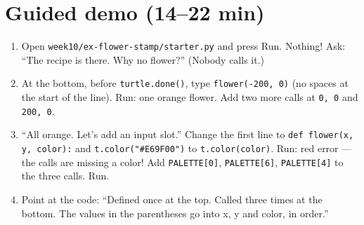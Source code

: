 \section{Guided demo (14--22 min)}
\begin{workedexample}
\begin{enumerate}[leftmargin=1.4em,itemsep=1pt]
  \item Open \texttt{week10/ex-flower-stamp/starter.py} and press Run. Nothing! Ask: \enquote{The recipe is there. Why no flower?} (Nobody calls it.)
  \item At the bottom, before \texttt{turtle.done()}, type \texttt{flower(-200, 0)} (no spaces at the start of the line). Run: one orange flower. Add two more calls at \texttt{0, 0} and \texttt{200, 0}.
  \item \enquote{All orange. Let's add an input slot.} Change the first line to \texttt{def flower(x, y, color):} and \texttt{t.color("\#E69F00")} to \texttt{t.color(color)}. Run: red error --- the calls are missing a color! Add \texttt{PALETTE[0]}, \texttt{PALETTE[6]}, \texttt{PALETTE[4]} to the three calls. Run.
  \item Point at the code: \enquote{Defined once at the top. Called three times at the bottom. The values in the parentheses go into x, y and color, in order.}
\end{enumerate}
\end{workedexample}

